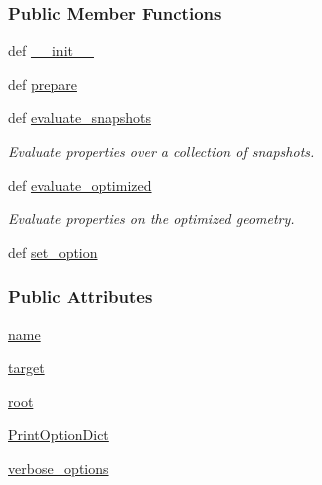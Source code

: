 \subsubsection*{Public Member Functions}
\begin{DoxyCompactItemize}
\item 
def \hyperlink{classforcebalance_1_1engine_1_1Engine_a907af5bf51d9ba4b010d6c2fa8cd85ff}{\-\_\-\-\_\-init\-\_\-\-\_\-}
\item 
def \hyperlink{classforcebalance_1_1engine_1_1Engine_a2eab57877002b41dc3742f0c67f2f24e}{prepare}
\item 
def \hyperlink{classforcebalance_1_1engine_1_1Engine_aceb1ac74d5f048dfbe620ceac7df8d32}{evaluate\-\_\-snapshots}
\begin{DoxyCompactList}\small\item\em Evaluate properties over a collection of snapshots. \end{DoxyCompactList}\item 
def \hyperlink{classforcebalance_1_1engine_1_1Engine_a0e88d58a45ebff5a5d741290e3589ee6}{evaluate\-\_\-optimized}
\begin{DoxyCompactList}\small\item\em Evaluate properties on the optimized geometry. \end{DoxyCompactList}\item 
def \hyperlink{classforcebalance_1_1BaseClass_a73e9a37a7632e79eb99f49bd15aced45}{set\-\_\-option}
\end{DoxyCompactItemize}
\subsubsection*{Public Attributes}
\begin{DoxyCompactItemize}
\item 
\hyperlink{classforcebalance_1_1engine_1_1Engine_add3a4bf15527832034d88fb692a37115}{name}
\item 
\hyperlink{classforcebalance_1_1engine_1_1Engine_a1fdd29fbd127cba331326a3557558e2a}{target}
\item 
\hyperlink{classforcebalance_1_1engine_1_1Engine_a82e9382a3316d3e26ef29efb58db4a00}{root}
\item 
\hyperlink{classforcebalance_1_1BaseClass_afc6659278497d7245bc492ecf405ccae}{Print\-Option\-Dict}
\item 
\hyperlink{classforcebalance_1_1BaseClass_afd68efa29ccd2f320f4cf82198214aac}{verbose\-\_\-options}
\end{DoxyCompactItemize}


